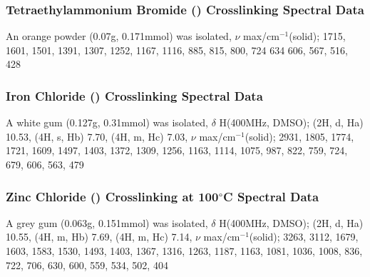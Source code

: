 


\subsubsection{Tetraethylammonium Bromide () Crosslinking Spectral Data}
An orange powder (0.07g, 0.171mmol)  was isolated, $\nu$ max/cm$^{-1}$(solid); 1715, 1601, 1501, 1391, 1307, 1252, 1167, 1116, 885, 815, 800, 724 634 606, 567, 516, 428

\subsubsection{Iron Chloride () Crosslinking Spectral Data}
A white gum (0.127g, 0.31mmol) was isolated, $\delta$ H(400MHz, DMSO); (2H, d, Ha) 10.53, (4H, s, Hb) 7.70, (4H, m, Hc) 7.03, $\nu$ max/cm$^{-1}$(solid); 2931, 1805, 1774, 1721, 1609, 1497, 1403, 1372, 1309, 1256, 1163, 1114, 1075, 987, 822, 759, 724, 679, 606, 563, 479

\subsubsection{Zinc Chloride () Crosslinking at 100$\degree$C Spectral Data}
A grey gum (0.063g, 0.151mmol) was isolated, $\delta$ H(400MHz, DMSO); (2H, d, Ha) 10.55, (4H, m, Hb) 7.69, (4H, m, Hc) 7.14, $\nu$ max/cm$^{-1}$(solid); 3263, 3112, 1679, 1603, 1583, 1530, 1493, 1403, 1367, 1316, 1263, 1187, 1163, 1081, 1036, 1008, 836, 722, 706, 630, 600, 559, 534, 502, 404

